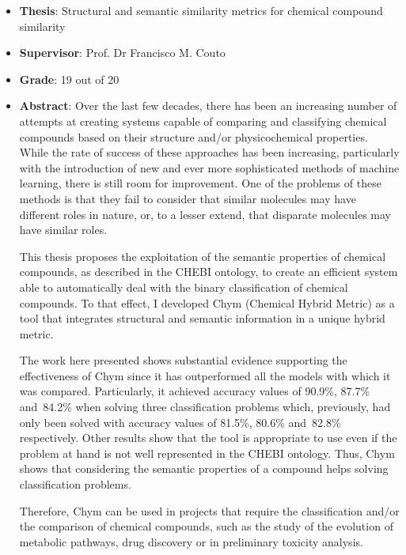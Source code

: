 \begin{itemize}
    \item \textbf{Thesis}: Structural and semantic similarity metrics for chemical compound similarity
    \item \textbf{Supervisor}: Prof. Dr Francisco M. Couto
    \item \textbf{Grade}: 19 out of 20
    \item \textbf{Abstract}: Over the last few decades, there has been an increasing number of attempts at creating systems capable of comparing and classifying chemical compounds based on their structure and\slash or physicochemical properties. While the rate of success of these approaches has been increasing, particularly with the introduction of new and ever more sophisticated methods of machine learning, there is still room for improvement. One of the problems of these methods is that they fail to consider that similar molecules may have different roles in nature, or, to a lesser extend, that disparate molecules may have similar roles.
    
    \hskip20pt This thesis proposes the exploitation of the semantic properties of chemical compounds, as described in the CHEBI ontology, to create an efficient system able to automatically deal with the binary classification of chemical compounds. To that effect, I developed Chym (Chemical Hybrid Metric) as a tool that integrates structural and semantic information in a unique hybrid metric. {\par}
    
    \hskip20pt The work here presented shows substantial evidence supporting the effectiveness of Chym since it has outperformed all the models with which it was compared. Particularly, it achieved accuracy values of 90.9\%, 87.7\% and~84.2\% when solving three classification problems which, previously, had only been solved with accuracy values of 81.5\%, 80.6\% and~82.8\% respectively. Other results show that the tool is appropriate to use even if the problem at hand is not well represented in the CHEBI ontology. Thus, Chym shows that considering the semantic properties of a compound helps solving classification problems. {\par}
    
    \hskip20pt Therefore, Chym can be used in projects that require the classification and\slash or the comparison of chemical compounds, such as the study of the evolution of metabolic pathways, drug discovery or in preliminary toxicity analysis. {\par}
\end{itemize}


